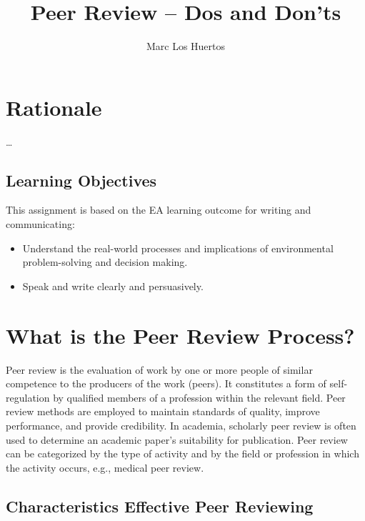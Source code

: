 \documentclass{tufte-handout}\usepackage[]{graphicx}\usepackage[]{color}
\title{Peer Review -- Dos and Don'ts %
}
\author[Marc Los Huertos]{Marc Los Huertos}
\begin{document}
\maketitle

\section{Rationale}

\ldots

\subsection{Learning Objectives}

This assignment is based on the EA learning outcome for writing and communicating: 

\begin{itemize}
	\item Understand the real-world processes and implications of environmental problem-solving and decision making.
	\item Speak and write clearly and persuasively.
\end{itemize}

\section{What is the Peer Review Process?}

Peer review is the evaluation of work by one or more people of similar competence to the producers of the work (peers). It constitutes a form of self-regulation by qualified members of a profession within the relevant field. Peer review methods are employed to maintain standards of quality, improve performance, and provide credibility. In academia, scholarly peer review is often used to determine an academic paper's suitability for publication. Peer review can be categorized by the type of activity and by the field or profession in which the activity occurs, e.g., medical peer review.

\subsection{Characteristics Effective Peer Reviewing}
\end{document}
